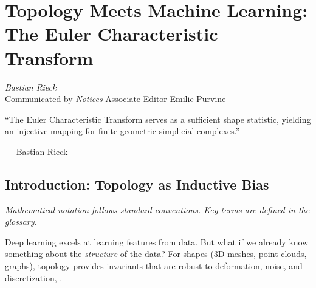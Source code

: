 \chapter{Topology Meets Machine Learning: The Euler Characteristic Transform} \cite{rieck2025topology}
\label{ch:ect}

\begin{flushright}
\textit{Bastian Rieck}\\
Communicated by \textit{Notices} Associate Editor Emilie Purvine
\end{flushright}

\epigraph{``The Euler Characteristic Transform serves as a sufficient shape statistic, yielding an injective mapping for finite geometric simplicial complexes.''}{--- Bastian Rieck} \cite{rieck2025topology}

\begin{abstract}
The Euler Characteristic Transform (ECT) converts a shape (simplicial complex) into a function on the sphere: for each direction, filter the shape by height and compute the Euler characteristic. The ECT is invertible, differentiable (via sigmoid approximation), and provides a topological inductive bias for deep learning. This chapter introduces the ECT, its mathematical foundations, and applications to shape classification and point cloud reconstruction, \cite{rieck2025topology}.
\end{abstract}

\section{Introduction: Topology as Inductive Bias}

\noindent\textit{Mathematical notation follows standard conventions. Key terms are defined in the glossary.}\n
\label{sec:ect:intro}

Deep learning excels at learning features from data. But what if we already know something about the \emph{structure} of the data? For shapes (3D meshes, point clouds, graphs), topology provides invariants that are robust to deformation, noise, and discretization, \cite{rieck2025topology}.

